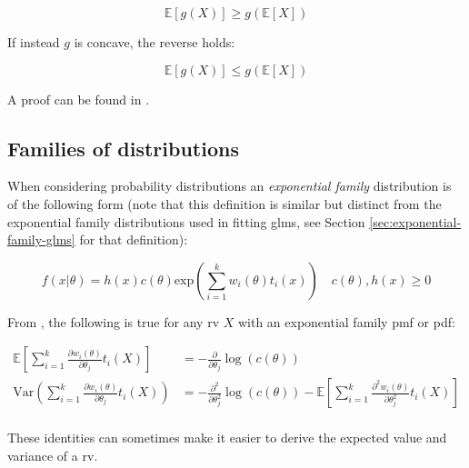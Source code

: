 \documentclass{report}
\begin{document}
\begin{equation}\label{eq:jensens-inequality-1}
    \mathbb{E}[g(X)] \geq g(\mathbb{E}[X])
\end{equation}

If instead $g$ is concave, the reverse holds:

\begin{equation}\label{eq:jensens-inequality-2}
    \mathbb{E}[g(X)] \leq g(\mathbb{E}[X])
\end{equation}

A proof can be found in \cite[Chapter~4.7.2]{casella_statistical_2002}. 

\subsection{Families of distributions}

When considering probability distributions an \textit{exponential family} distribution is of the following form (note that this definition is similar but distinct from the exponential family distributions used in fitting \glspl{glm}, see Section \ref{sec:exponential-family-glms} for that definition):

\begin{equation}\label{eq:exponential-family-dist}
    f(x | \theta) = h(x) c(\theta) \text{exp} \left(\sum_{i=1}^k w_i(\theta) t_i(x)\right) \quad c(\theta), h(x) \geq 0 
\end{equation}

From \cite[Chapter~3.4]{casella_statistical_2002}, the following is true for any \gls{rv} $X$ with an exponential family \gls{pmf} or \gls{pdf}:

\begin{equation}\label{eq:exponential-family-properties}
    \begin{aligned}
        \mathbb{E}\left[\sum_{i=1}^k \frac{\partial w_i(\theta)}{\partial\theta_j}t_i(X)\right] &= -\frac{\partial}{\partial\theta_j} \log(c(\theta)) \\
        \text{Var}\left(\sum_{i=1}^k \frac{\partial w_i(\theta)}{\partial\theta_j}t_i(X)\right) &= -\frac{\partial^2}{\partial\theta_j^2} \log(c(\theta)) - \mathbb{E}\left[\sum_{i=1}^k \frac{\partial^2w_i(\theta)}{\partial\theta_j^2} t_i(X)\right] \\
    \end{aligned}
\end{equation}

These identities can sometimes make it easier to derive the expected value and variance of a \gls{rv}. 
\end{document}
